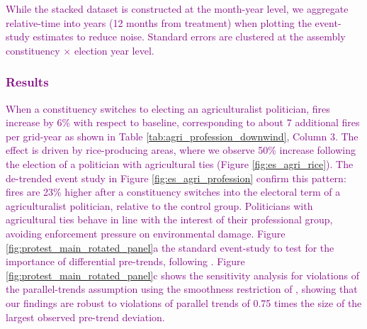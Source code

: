 \documentclass[12pt]{article}
\begin{document}
 \textcolor{purple}{While the stacked dataset is constructed at the month-year level, we aggregate relative-time into years (12 months from treatment) when plotting the event-study estimates to reduce noise.
Standard errors are clustered at the assembly constituency $\times$ election year level. 

\subsubsection{Results\label{sssec:results3}}


When a constituency switches to electing an agriculturalist politician, fires increase by 6\% with respect to baseline, corresponding to about 7 additional fires per grid-year as shown in Table \ref{tab:agri_profession_downwind}, Column 3. The effect is driven by rice-producing areas, where we observe 50\% increase following the election of a politician with agricultural ties  (Figure \ref{fig:es_agri_rice}). The de-trended event study in Figure \ref{fig:es_agri_profession} confirm this pattern:  fires are 23\% higher after a constituency switches into the electoral term of a agriculturalist politician, relative to the control group. Politicians with agricultural ties behave in line with the interest of their professional group, avoiding enforcement pressure on environmental damage.
\textcolor{purple}{Figure \ref{fig:protest_main_rotated_panel}a the standard event-study to test for the importance of differential pre-trends, following \citet{dustmann2022reallocation}. Figure \ref{fig:protest_main_rotated_panel}c shows the sensitivity analysis for violations of the parallel-trends assumption using the smoothness restriction of \citet{rambachan2023more}, showing that our findings are robust to violations of parallel trends of 0.75 times the size of the largest observed pre-trend deviation.}





}
\end{document}
